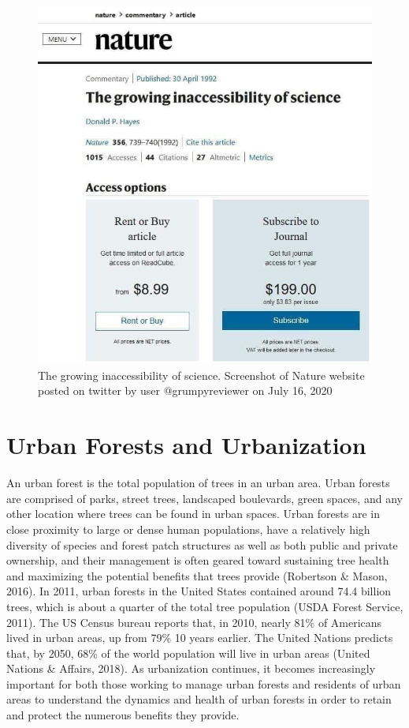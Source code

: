\documentclass[12pt,twoside]{reedthesis}
\begin{document}
\begin{figure}

{\centering \includegraphics[width=0.75\linewidth]{figure/science_inaccessable} 

}

\caption[The growing inaccessibility of science]{The growing inaccessibility of science. Screenshot of Nature website posted on twitter by user @grumpyreviewer on July 16, 2020}\label{fig:twitter-pic}
\end{figure}
\hypertarget{urban-forests-and-urbanization}{%
\section{Urban Forests and Urbanization}\label{urban-forests-and-urbanization}}

An urban forest is the total population of trees in an urban area. Urban
forests are comprised of parks, street trees, landscaped boulevards,
green spaces, and any other location where trees can be found in urban
spaces. Urban forests are in close proximity to large or dense human
populations, have a relatively high diversity of species and forest
patch structures as well as both public and private ownership, and their
management is often geared toward sustaining tree health and maximizing
the potential benefits that trees provide (Robertson \& Mason, 2016). In 2011,
urban forests in the United States contained around 74.4 billion trees,
which is about a quarter of the total tree population
(USDA Forest Service, 2011). The US Census bureau reports that, in 2010,
nearly 81\% of Americans lived in urban areas, up from 79\% 10 years
earlier. The United Nations predicts that, by 2050, 68\% of the world
population will live in urban areas (United Nations \& Affairs, 2018). As
urbanization continues, it becomes increasingly important for both those
working to manage urban forests and residents of urban areas to
understand the dynamics and health of urban forests in order to retain
and protect the numerous benefits they provide.
\end{document}
